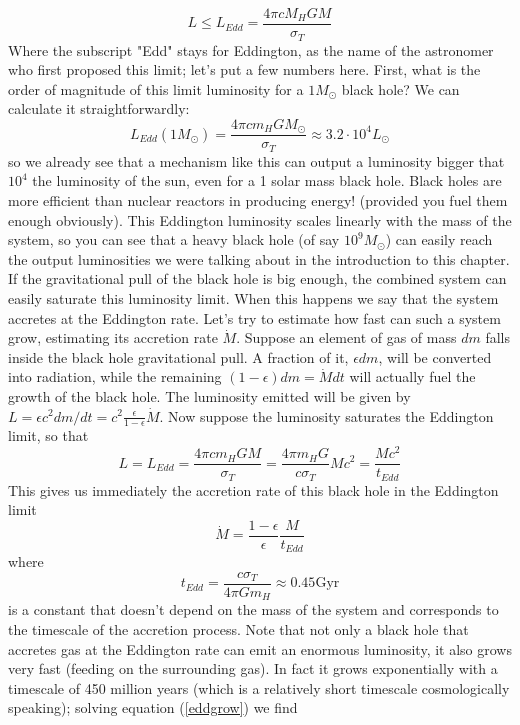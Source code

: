 \begin{equation}
L\leq L_{Edd} = \frac{4\pi c M_H G M}{\sigma_T}
\end{equation}
Where the subscript "Edd" stays for Eddington, as the name of the astronomer who first proposed this limit; let's put a few numbers here. First, what is the order of magnitude of this limit luminosity for a $1M_\odot$ black hole? We can calculate it straightforwardly:
\begin{equation}
L_{Edd}(1M_\odot)=\frac{4\pi c m_H G M_\odot}{\sigma_T}\approx 3.2\cdot 10^4 L_\odot
\end{equation} 
so we already see that a mechanism like this can output a luminosity bigger that $10^4$ the luminosity of the sun, even for a 1 solar mass black hole. Black holes are more efficient than nuclear reactors in producing energy! (provided you fuel them enough obviously). This Eddington luminosity scales linearly with the mass of the system, so you can see that a heavy black hole (of say $10^9M_\odot$) can easily reach the output luminosities we were talking about in the introduction to this chapter. If the gravitational pull of the black hole is big enough, the combined system can easily saturate this luminosity limit. When this happens we say that the system accretes at the Eddington rate. Let's try to estimate how fast can such a system grow, estimating its accretion rate $\dot{M}$. Suppose an element of gas of mass $dm$ falls inside the black hole gravitational pull. A fraction of it, $\epsilon dm$, will be converted into radiation, while the remaining $(1-\epsilon)dm = \dot{M}dt$ will actually fuel the growth of the black hole. The luminosity emitted will be given by $L = \epsilon c^2dm/dt = c^2\frac{\epsilon}{1-\epsilon}\dot{M}$. Now suppose the luminosity saturates the Eddington limit, so that
\begin{equation}
L = L_{Edd} = \frac{4\pi c m_H G M}{\sigma_T} = \frac{4\pi m_H G}{c\sigma_T}Mc^2 = \frac{Mc^2}{t_{Edd}} 
\end{equation}
This gives us immediately the accretion rate of this black hole in the Eddington limit
\begin{equation}
\dot{M}=\frac{1-\epsilon}{\epsilon}\frac{M}{t_{Edd}}
\end{equation}
where
\begin{equation}
\label{eddgrow}
t_{Edd} = \frac{c\sigma_T}{4\pi G m_H}\approx 0.45 \mathrm{Gyr}
\end{equation}
is a constant that doesn't depend on the mass of the system and corresponds to the timescale of the accretion process. Note that not only a black hole that accretes gas at the Eddington rate can emit an enormous luminosity, it also grows very fast (feeding on the surrounding gas). In fact it grows exponentially with a timescale of 450 million years (which is a relatively short timescale cosmologically speaking); solving equation (\ref{eddgrow}) we find
